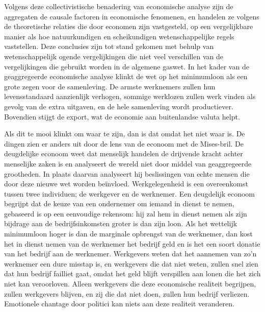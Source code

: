 Volgens deze collectivistische benadering van economische analyse zijn de aggregaten de causale factoren in economische fenomenen, en handelen ze volgens de theoretische relaties die door economen zijn vastgesteld, op een vergelijkbare manier als hoe natuurkundigen en scheikundigen wetenschappelijke regels vaststellen. Deze conclusies zijn tot stand gekomen met behulp van wetenschappelijk ogende vergelijkingen die niet veel verschillen van de vergelijkingen die gebruikt worden in de algemene gaswet. In het kader van de geaggregeerde economische analyse klinkt de wet op het minimumloon als een grote zegen voor de samenleving. De armste werknemers zullen hun levensstandaard aanzienlijk verhogen, sommige werklozen zullen werk vinden als gevolg van de extra uitgaven, en de hele samenleving wordt productiever. Bovendien stijgt de export, wat de economie aan buitenlandse valuta helpt.

Als dit te mooi klinkt om waar te zijn, dan is dat omdat het niet waar is. De dingen zien er anders uit door de lens van de econoom met de Mises-bril. De deugdelijke econoom weet dat menselijk handelen de drijvende kracht achter menselijke zaken is en analyseert de wereld niet door middel van geaggregeerde grootheden. In plaats daarvan analyseert hij beslissingen van echte mensen die door deze nieuwe wet worden beïnvloed. Werkgelegenheid is een overeenkomst tussen twee individuen; de werkgever en de werknemer. Een deugdelijk econoom begrijpt dat de keuze van een ondernemer om iemand in dienst te nemen, gebaseerd is op een eenvoudige rekensom: hij zal hem in dienst nemen als zijn bijdrage aan de bedrijfsinkomsten groter is dan zijn loon. Als het wettelijk minimumloon hoger is dan de marginale opbrengst van de werknemer, dan kost het in dienst nemen van de werknemer het bedrijf geld en is het een soort donatie van het bedrijf aan de werknemer. Werkgevers weten dat het aannemen van zo’n werknemer een dure misstap is, en werkgevers die dat niet weten, zullen snel zien dat hun bedrijf failliet gaat, omdat het geld blijft verspillen aan lonen die het zich niet kan veroorloven. Alleen werkgevers die deze economische realiteit begrijpen, zullen werkgevers blijven, en zij die dat niet doen, zullen hun bedrijf verliezen. Emotionele chantage door politici kan niets aan deze realiteit veranderen.


